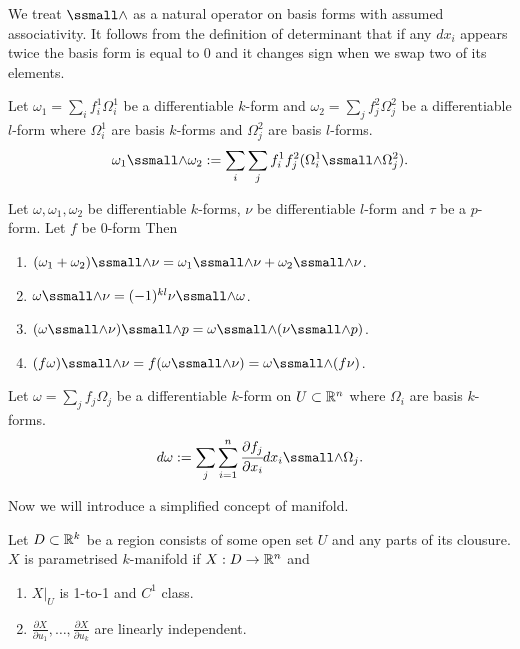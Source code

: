 \documentclass[main.tex]{subfiles}
\begin{document}
We treat $\form$ as a natural operator on basis forms with assumed associativity.
It follows from the definition of determinant that if any $dx_i$ appears twice the basis form is equal to $0$ and it changes sign when we swap two of its elements.
\begin{definition}
Let $\omega_1 = \sum_i f^1_i \Omega^1_i$ be a differentiable $k$-form and $\omega_2 = \sum_j f^2_j \Omega^2_j$ be a differentiable $l$-form where $\Omega^1_i$ are basis $k$-forms and $\Omega^2_j$ are basis $l$-forms.
\begin{equation}
\omega_1 \form \omega_2 :=  \sum_i \sum_j f^1_i f^2_j (\Omega^1_i \form \Omega^2_j).
\end{equation}
\end{definition}
\begin{theorem}
Let $\omega, \omega_1, \omega_2$ be differentiable $k$-forms, $\nu$ be differentiable $l$-form and $\tau$ be a $p$-form. Let $f$ be $0$-form Then
\begin{enumerate}
\item $(\omega_1 + \omega_2)\form \nu = \omega_1\form \nu + \omega_2\form \nu$.
\item $\omega\form \nu = (-1)^{kl}\nu\form\omega$.
\item $(\omega\form \nu) \form p = \omega\form(\nu\form p)$.
\item $(f\omega)\form \nu = f(\omega\form \nu) = \omega\form (f\nu)$. 
\end{enumerate}
\end{theorem}
\begin{definition}
Let $\omega = \sum_j f_j \Omega_j$ be a differentiable $k$-form on $U\subset\mathbb{R}^n$ where $\Omega_i$ are basis $k$-forms.
\begin{equation}
d\omega := \sum_j \sum_{i=1}^n \cfrac{\partial f_j}{\partial x_i} dx_i \form \Omega_j. 
\end{equation}
\end{definition}
Now we will introduce a simplified concept of manifold.
\begin{definition}
Let $D\subset \mathbb{R}^k$ be a region consists of some open set $U$ and any parts of its clousure.
$X$ is parametrised $k$-manifold if
$X:D\to \mathbb{R}^n$ and
\begin{enumerate}
\item
$X|_U$ is 1-to-1 and $C^1$ class.
\item
$\frac{\partial X}{\partial u_1}, \dots, \frac{\partial X}{\partial u_k}$ are linearly independent.
\end{enumerate}
\end{definition}
\end{document}
